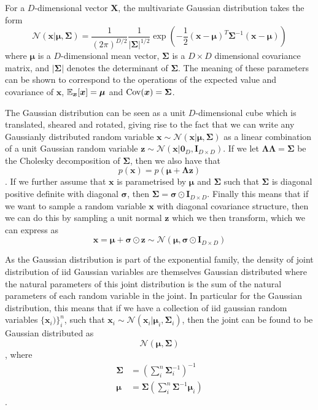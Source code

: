 For a $D$-dimensional vector $\bm{X}$, the multivariate Gaussian distribution
takes the form
\begin{equation}
  \label{eq:Gaussian_dist}
  \mathcal{N}(\bm{x} | \bm{\mu}, \bm{\Sigma}) = \frac{1}{(2\pi)^{D/2}}\frac{1}{|\bm{\Sigma}|^{1/2}}\exp\left( -\frac{1}{2}(\bm{x} - \bm{\mu})^T\bm{\Sigma}^{-1}(\bm{x} - \bm{\mu})\right)
\end{equation}
where $\bm{\mu}$ is a $D$-dimensional mean vector, $\bm{\Sigma}$ is a $D \times
D$ dimensional covariance matrix, and $|\bm{\Sigma}|$ denotes the determinant of
$\bm{\Sigma}$. The meaning of these parameters can be shown to correspond to the
operations of the expected value and covariance of $\bm{x}$,
$\operatorname{\mathbb{E}}_{\bm{x}}[\bm{x}] = \bm{\mu}$ and $\operatorname{\text{Cov}}(\bm{x}) = \bm{\Sigma}$.

The Gaussian distribution can be seen as a unit $D$-dimensional cube which is
translated, sheared and rotated, giving rise to the fact that we can write any
Gaussianly distributed random variable $\bm{x} \sim \mathcal{N}(\bm{x} |
\bm{\mu}, \bm{\Sigma})$ as a linear combination of a unit Gaussian random
variable $\bm{z} \sim \mathcal{N}(\bm{x} | \bm{0}_D, \bm{I}_{D \times D})$. If
we let $\bm{\Lambda} \bm{\Lambda} = \bm{\Sigma}$ be the Cholesky
decomposition\cite[p.~100-102]{Press:2007:NRE:1403886} of $\bm{\Sigma}$, then we
also have that
\begin{equation*}
  p(\bm{x}) = p(\bm{\mu} + \bm{\Lambda}\bm{z})
\end{equation*}
. If we further assume that $\bm{x}$ is parametrised by $\bm{\mu}$ and
$\bm{\Sigma}$ such that $\bm{\Sigma}$ is diagonal positive definite with
diagonal $\bm{\sigma}$, then $\bm{\Sigma} = \bm{\sigma} \odot \bm{I}_{D \times
  D}$. Finally this means that if we want to sample a random variable $\bm{x}$
with diagonal covariance structure, then we can do this by sampling a unit
normal $\bm{z}$ which we then transform, which we can express as
\begin{equation}
  \label{eq:sample_x}
  \bm{x} = \bm{\mu} + \bm{\sigma} \odot \bm{z} \sim \mathcal{N}(\bm{\mu}, \bm{\sigma} \odot \bm{I}_{D \times D})
\end{equation}

As the Gaussian distribution is part of the exponential family, the density of
joint distribution of iid Gaussian variables are themselves Gaussian distributed
where the natural parameters of this joint distribution is the sum of the
natural parameters of each random variable in the joint. In particular for the
Gaussian distribution, this means that if we have a collection of iid gaussian
random variables $\{\bm{x}_i)\}_i^n$, such that $\bm{x}_i \sim
\mathcal{N}(\bm{x}_i | \bm{\mu}_i, \bm{\Sigma}_{i})$, then the joint
can be found to be Gaussian distributed as
\begin{equation}
  \label{eq:join_dist_Gaussian}
  \mathcal{N}(\bm{\mu}, \bm{\Sigma})
\end{equation},
where
\begin{align*}
  \bm{\Sigma} & = \left( \sum_i^n \bm{\Sigma}_i^{-1} \right)^{-1}\\ 
  \bm{\mu} & = \bm{\Sigma}\left( \sum_i^n \bm{\Sigma}^{-1} \bm{\mu}_i \right)
\end{align*}.\cite[p.~78-84]{Bishop:2006}

